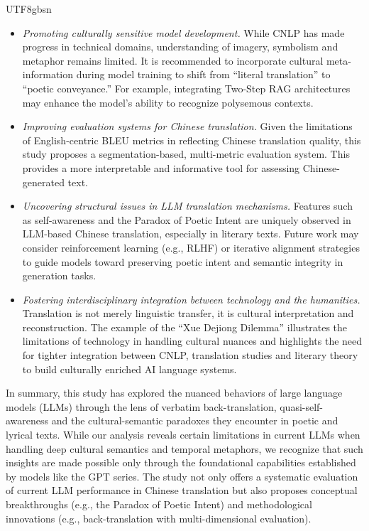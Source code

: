 \documentclass[conference]{IEEEtran}
\begin{document}
\begin{CJK}{UTF8}{gbsn}
\begin{itemize}
\item \textit{Promoting culturally sensitive model development.} While CNLP has made progress in technical domains, understanding of imagery, symbolism and metaphor remains limited. It is recommended to incorporate cultural meta-information during model training to shift from ``literal translation'' to ``poetic conveyance.'' For example, integrating Two-Step RAG architectures may enhance the model's ability to recognize polysemous contexts.
\item \textit{Improving evaluation systems for Chinese translation.} Given the limitations of English-centric BLEU metrics in reflecting Chinese translation quality, this study proposes a segmentation-based, multi-metric evaluation system. This provides a more interpretable and informative tool for assessing Chinese-generated text.
\item \textit{Uncovering structural issues in LLM translation mechanisms.} Features such as self-awareness and the Paradox of Poetic Intent are uniquely observed in LLM-based Chinese translation, especially in literary texts. Future work may consider reinforcement learning (e.g., RLHF) or iterative alignment strategies to guide models toward preserving poetic intent and semantic integrity in generation tasks.
\item \textit{Fostering interdisciplinary integration between technology and the humanities.} Translation is not merely linguistic transfer, it is cultural interpretation and reconstruction. The example of the ``Xue Dejiong Dilemma'' illustrates the limitations of technology in handling cultural nuances and highlights the need for tighter integration between CNLP, translation studies and literary theory to build culturally enriched AI language systems.
\end{itemize}

In summary, this study has explored the nuanced behaviors of large language models (LLMs) through the lens of verbatim back-translation, quasi-self-awareness and the cultural-semantic paradoxes they encounter in poetic and lyrical texts. While our analysis reveals certain limitations in current LLMs when handling deep cultural semantics and temporal metaphors, we recognize that such insights are made possible only through the foundational capabilities established by models like the GPT series. The study not only offers a systematic evaluation of current LLM performance in Chinese translation but also proposes conceptual breakthroughs (e.g., the Paradox of Poetic Intent) and methodological innovations (e.g., back-translation with multi-dimensional evaluation).


\end{CJK}
\end{document}
